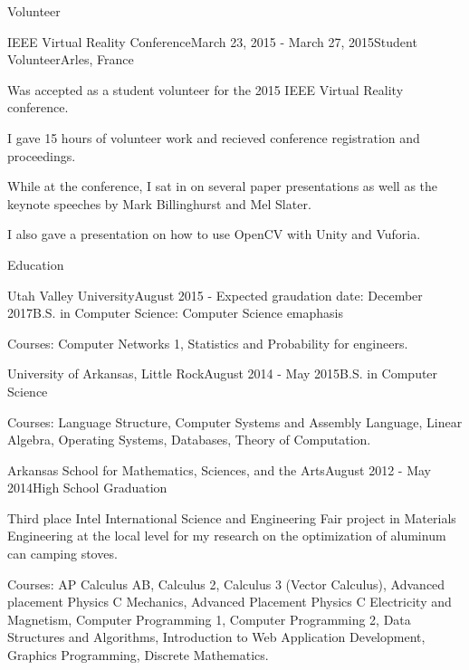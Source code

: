 \documentclass{resume} %
\begin{document}
\begin{rSection}{Volunteer}

\begin{rSubsection}{IEEE Virtual Reality Conference}{March 23, 2015 - March 27, 2015}{Student Volunteer}{Arles, France}
	\item Was accepted as a student volunteer for the 2015 IEEE Virtual Reality conference.
	\item I gave 15 hours of volunteer work and recieved conference registration and proceedings.
	\item While at the conference, I sat in on several paper presentations as well as the keynote speeches by Mark Billinghurst and Mel Slater.
	\item I also gave a presentation on how to use OpenCV with Unity and Vuforia.
\end{rSubsection}

\end{rSection}


\begin{rSection}{Education}

\begin{rSubsection}{Utah Valley University}{August 2015 - Expected graudation date: December 2017}{B.S. in Computer Science: Computer Science emaphasis}
	\item Courses: Computer Networks 1, Statistics and Probability for engineers.
\end{rSubsection}

\begin{rSubsection}{University of Arkansas, Little Rock}{August 2014 - May 2015}{B.S. in Computer Science}
	\item Courses: Language Structure, Computer Systems and Assembly Language, Linear Algebra, Operating Systems, Databases, Theory of Computation.
\end{rSubsection}

\begin{rSubsection}{Arkansas School for Mathematics, Sciences, and the Arts}{August 2012 - May 2014}{High School Graduation}
	\item Third place Intel International Science and Engineering Fair project in Materials Engineering at the local level for my research on the optimization of aluminum can camping stoves.
	\item Courses: AP Calculus AB, Calculus 2, Calculus 3 (Vector Calculus), Advanced placement Physics C Mechanics, Advanced Placement Physics C Electricity and Magnetism, Computer Programming 1, Computer Programming 2, Data Structures and Algorithms, Introduction to Web Application Development, Graphics Programming, Discrete Mathematics.
\end{rSubsection}

\end{rSection}
\end{document}
